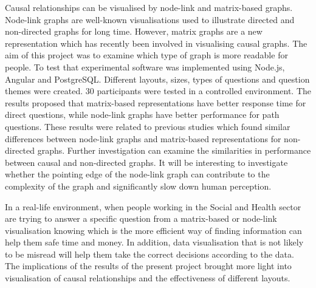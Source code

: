 \documentclass{l4proj}
\begin{document}
Causal relationships can be visualised by node-link and matrix-based graphs. Node-link graphs are well-known visualisations used to illustrate directed and non-directed graphs for long time. However, matrix graphs are a new representation which has recently been involved in visualising causal graphs. The aim of this project was to examine which type of graph is more readable for people. To test that experimental software was implemented using Node.js, Angular and PostgreSQL. Different layouts, sizes, types of questions and question themes were created. 30 participants were tested in a controlled environment. The results proposed that matrix-based representations have better response time for direct questions, while node-link graphs have better performance for path questions. These results were related to previous studies which found similar differences between node-link graphs and matrix-based representations for non-directed graphs. Further investigation can examine the similarities in performance between causal and non-directed graphs. It will be interesting to investigate whether the pointing edge of the node-link graph can contribute to the complexity of the graph and significantly slow down human perception.

In a real-life environment, when people working in the Social and Health sector are trying to answer a specific question from a matrix-based or node-link visualisation knowing which is the more efficient way of finding information can help them safe time and money. In addition, data visualisation that is not likely to be misread will help them take the correct decisions according to the data. The implications of the results of the present project brought more light into visualisation of causal relationships and the effectiveness of different layouts.
\end{document}
